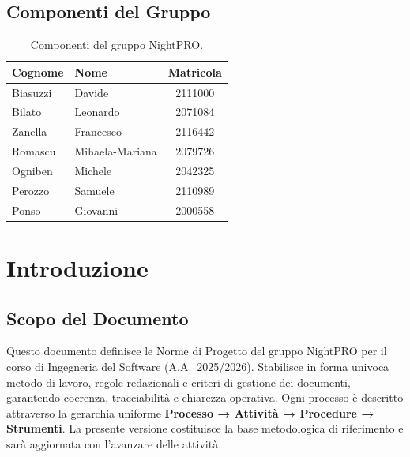 \documentclass[a4paper, 11pt, oneside]{scrartcl}
\begin{document}
\subsection{Componenti del Gruppo}

\begin{table}[h!]
    \centering
    \renewcommand{\arraystretch}{1.2}
    \begin{tabular}{@{}llc@{}}
        \toprule
        \textbf{Cognome} & \textbf{Nome}   & \textbf{Matricola} \\
        \midrule
        Biasuzzi         & Davide          & 2111000            \\
        Bilato           & Leonardo        & 2071084            \\
        Zanella          & Francesco       & 2116442            \\
        Romascu          & Mihaela-Mariana & 2079726            \\
        Ogniben          & Michele         & 2042325            \\
        Perozzo          & Samuele         & 2110989            \\
        Ponso            & Giovanni        & 2000558            \\
        \bottomrule
    \end{tabular}
    \caption{Componenti del gruppo NightPRO.}
\end{table}

\newpage
\section{Introduzione}
\label{sec:introduzione}

\subsection{Scopo del Documento}
Questo documento definisce le Norme di Progetto{\scriptsize{}} del gruppo NightPRO per il corso di Ingegneria del Software (A.A.~2025/2026).
Stabilisce in forma univoca metodo di lavoro, regole redazionali e criteri di gestione dei documenti, garantendo coerenza, tracciabilità e chiarezza operativa.
Ogni processo è descritto attraverso la gerarchia uniforme \textbf{Processo → Attività → Procedure → Strumenti}.
La presente versione costituisce la base metodologica di riferimento e sarà aggiornata con l'avanzare delle attività.
\end{document}
